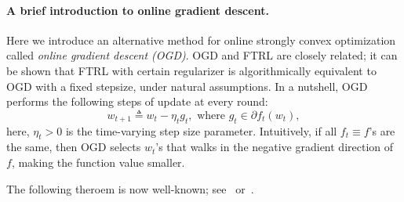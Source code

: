 \documentclass{article}
\newcommand{\defeq}{\triangleq}
\begin{document}
\paragraph{A brief introduction to online gradient descent.} Here we introduce an alternative method for online strongly convex optimization called {\em online gradient descent (OGD)}. OGD and FTRL are closely related; it can be shown that FTRL with certain regularizer is algorithmically equivalent to OGD with a fixed stepsize, under natural assumptions. In a nutshell, OGD performs the following steps of update at every round:
\[ w_{t+1} \defeq w_t - \eta_t g_t, \text{ where } g_t \in \partial f_t(w_t), \]
here, $\eta_t > 0$ is the time-varying step size parameter. Intuitively, if all $f_t \equiv f$'s are the same, then OGD selects $w_t$'s that walks in the negative gradient direction of $f$, making the function value smaller.

The following theroem is now well-known; see~\cite[][Theorem 1]{hazan2007logarithmic} or~\cite[][Section 14.4.4 and 14.5.3]{shalev2014understanding}.
\end{document}
